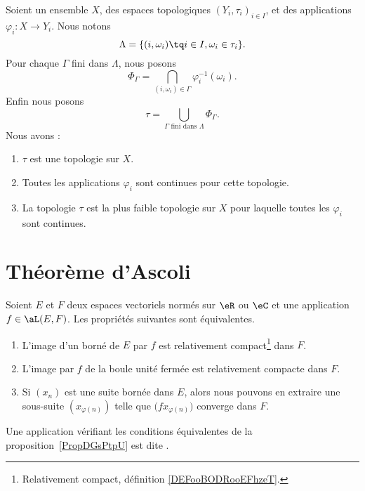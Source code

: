\begin{proposition}     \label{PROPooGOEVooZBAOQh}
	Soient un ensemble \( X\), des espaces topologiques \( (Y_i,\tau_i)_{i\in I}\), et des applications \( \varphi_i\colon X\to Y_i\). Nous notons
	\begin{equation}
		\Lambda=\{ (i,\omega_i)\tq i\in I, \omega_i\in \tau_i \}.
	\end{equation}
	Pour chaque \( \Gamma\) fini dans \( \Lambda\), nous posons
	\begin{equation}
		\Phi_{\Gamma}=\bigcap_{(i,\omega_i)\in \Gamma}\varphi_i^{-1}(\omega_i).
	\end{equation}
	Enfin nous posons
	\begin{equation}
		\tau=\bigcup_{\Gamma\text{ fini dans } \Lambda}\Phi_{\Gamma}.
	\end{equation}
	Nous avons :
	\begin{enumerate}
		\item
		      \( \tau\) est une topologie sur \( X\).
		\item
		      Toutes les applications \( \varphi_i\) sont continues pour cette topologie.
		\item
		      La topologie \( \tau\) est la plus faible topologie sur \( X\) pour laquelle toutes les \( \varphi_i\) sont continues.
	\end{enumerate}
\end{proposition}

\section{Théorème d'Ascoli}


\begin{propositionDef} \label{PropDGsPtpU}
	Soient \( E\) et \( F\) deux espaces vectoriels normés sur \( \eR\) ou \( \eC\) et une application \( f\in\aL(E,F)\). Les propriétés suivantes sont équivalentes.
	\begin{enumerate}
		\item
            L'image d'un borné de \( E\) par \( f\) est relativement compact\footnote{Relativement compact, définition \ref{DEFooBODRooEFhzeT}.} dans \( F\).
		\item   \label{ItemJIkpUbLii}
		      L'image par \( f\) de la boule unité fermée est relativement compacte dans \( F\).
		\item
		      Si \( (x_n)\) est une suite bornée dans \( E\), alors nous pouvons en extraire une sous-suite \( (x_{\varphi(n)})\) telle que \( \big( fx_{\varphi(n)} \big)\) converge dans \( F\).
	\end{enumerate}
	Une application vérifiant les conditions équivalentes de la proposition~\ref{PropDGsPtpU} est dite .
\end{propositionDef}

